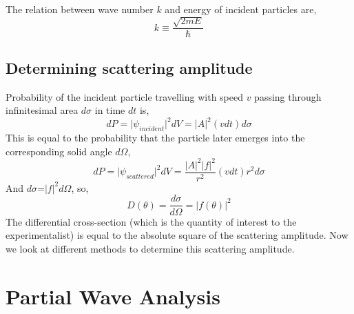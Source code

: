 The relation between wave number $k$ and energy of incident particles are,
\begin{equation}
	k\equiv \frac{\sqrt{2mE}}{\hbar}
\end{equation}
\subsection{Determining scattering amplitude}
Probability of the incident particle travelling with speed $v$ passing through infinitesimal area $d\sigma$ in time $dt$ is,
\begin{equation}
	dP=\vert \psi_{incident}\vert^2dV=\vert A \vert^2(v dt)d\sigma
\end{equation}
This is equal to the probability that the particle later emerges into the corresponding solid angle $d\Omega$,
\begin{equation}
	dP=\vert \psi_{scattered}\vert^2dV=\frac{\vert A \vert^2\vert f \vert^2}{r^2}(v dt)r^2d\sigma
\end{equation}
And $d\sigma$=$\vert f\vert^2d\Omega$, so,
\begin{equation}
	D(\theta)=\frac{d\sigma}{d\Omega}=\vert f(\theta)\vert^2
\end{equation}
The differential cross-section (which is the quantity of interest to the experimentalist) is equal to the	absolute square of the scattering amplitude. Now we look at different methods to determine this scattering amplitude.

\newpage

\section{Partial Wave Analysis}
